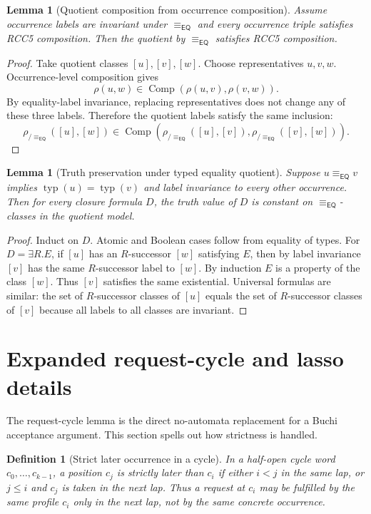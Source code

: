 \documentclass[11pt]{article}
\newtheorem{lemma}[theorem]{Lemma}
\newtheorem{definition}[theorem]{Definition}
\newcommand{\EQ}{\mathsf{EQ}}
\newcommand{\comp}{\operatorname{Comp}}
\newcommand{\typ}{\operatorname{typ}}
\newcommand{\eqc}{\equiv_{\EQ}}
\begin{document}
\begin{lemma}[Quotient composition from occurrence composition]
Assume occurrence labels are invariant under $\eqc$ and every occurrence triple satisfies RCC5 composition.  Then the quotient by $\eqc$ satisfies RCC5 composition.
\end{lemma}

\begin{proof}
Take quotient classes $[u],[v],[w]$.  Choose representatives $u,v,w$.  Occurrence-level composition gives
\[
  \rho(u,w)\in\comp(\rho(u,v),\rho(v,w)).
\]
By equality-label invariance, replacing representatives does not change any of these three labels.  Therefore the quotient labels satisfy the same inclusion:
\[
  \rho_{/\eqc}([u],[w])\in
  \comp(\rho_{/\eqc}([u],[v]),\rho_{/\eqc}([v],[w])).
\]
\end{proof}

\begin{lemma}[Truth preservation under typed equality quotient]
Suppose $u\eqc v$ implies $\typ(u)=\typ(v)$ and label invariance to every other occurrence.  Then for every closure formula $D$, the truth value of $D$ is constant on $\eqc$-classes in the quotient model.
\end{lemma}

\begin{proof}
Induct on $D$.  Atomic and Boolean cases follow from equality of types.  For $D=\exists R.E$, if $[u]$ has an $R$-successor $[w]$ satisfying $E$, then by label invariance $[v]$ has the same $R$-successor label to $[w]$.  By induction $E$ is a property of the class $[w]$.  Thus $[v]$ satisfies the same existential.  Universal formulas are similar: the set of $R$-successor classes of $[u]$ equals the set of $R$-successor classes of $[v]$ because all labels to all classes are invariant.
\end{proof}

\section{Expanded request-cycle and lasso details}

The request-cycle lemma is the direct no-automata replacement for a Buchi acceptance argument.  This section spells out how strictness is handled.

\begin{definition}[Strict later occurrence in a cycle]
In a half-open cycle word $c_0,\ldots,c_{k-1}$, a position $c_j$ is strictly later than $c_i$ if either $i<j$ in the same lap, or $j\le i$ and $c_j$ is taken in the next lap.  Thus a request at $c_i$ may be fulfilled by the same profile $c_i$ only in the next lap, not by the same concrete occurrence.
\end{definition}
\end{document}

